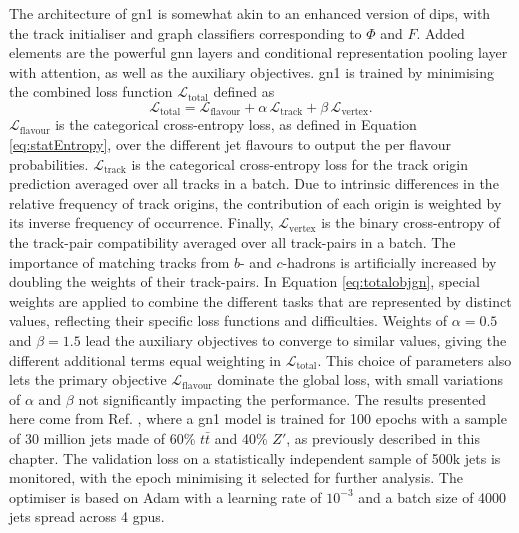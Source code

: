The architecture of \gls{gn1} is somewhat akin to an enhanced version of \gls{dips}, with the track initialiser and graph classifiers corresponding to $\Phi$ and $F$. Added elements are the powerful \gls{gnn} layers and conditional representation pooling layer with attention, as well as the auxiliary objectives. \gls{gn1} is trained by  minimising the combined loss function $\mathcal{L}_{\textrm{total}}$ defined as 
\begin{equation}\label{eq:totalobjgn}
  \mathcal{L}_{\textrm{total}} = \mathcal{L}_{\textrm{flavour}} + \alpha \, \mathcal{L}_{\textrm{track}} + \beta \, \mathcal{L}_{\textrm{vertex}}.
\end{equation}
$\mathcal{L}_{\textrm{flavour}}$ is the categorical cross-entropy loss, as defined in Equation \ref{eq:statEntropy}, over the different jet flavours to output the per flavour probabilities. $\mathcal{L}_{\textrm{track}}$ is the categorical cross-entropy loss for the track origin prediction averaged over all tracks in a batch. Due to intrinsic differences in the relative frequency of track origins, the contribution of each origin is weighted by its inverse frequency of occurrence. Finally, $\mathcal{L}_{\textrm{vertex}}$ is the binary cross-entropy of the track-pair compatibility averaged over all track-pairs in a batch. The importance of matching tracks from $b$- and $c$-hadrons is artificially increased by doubling the weights of their track-pairs. In Equation \ref{eq:totalobjgn}, special weights are applied to combine the different tasks that are represented by distinct values, reflecting their specific loss functions and difficulties. Weights of $\alpha = 0.5$ and $\beta = 1.5$ \cite{ATL-PHYS-PUB-2022-027} lead the auxiliary objectives to converge to similar values, giving the different additional terms equal weighting in $\mathcal{L}_{\textrm{total}}$. This choice of parameters also lets the primary objective $\mathcal{L}_{\textrm{flavour}}$ dominate the global loss, with small variations of $\alpha$ and $\beta$ not significantly impacting the performance. The results presented here come from Ref. \cite{ATL-PHYS-PUB-2022-027}, where a \gls{gn1} model is trained for 100 epochs with a sample of 30 million jets made of 60\% $t\bar{t}$ and 40\% $Z'$, as previously described in this chapter. The validation loss on a statistically independent sample of 500k jets is monitored, with the epoch minimising it selected for further analysis. The optimiser is based on Adam \cite{adamPaper} with a learning rate of $10^{-3}$ and a batch size of 4000 jets spread across 4 \glspl{gpu}. \\



